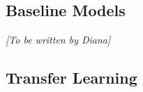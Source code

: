 \documentclass[11pt,a4paper]{article}
\begin{document}
\subsection{Baseline Models}
%
%
%

\textit{[To be written by Diana]}

\subsection{Transfer Learning}
\label{sec:transfer}
%
%
%
%
%
\end{document}
